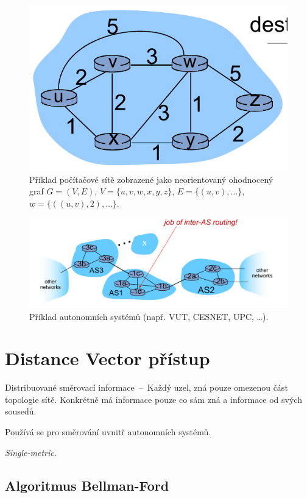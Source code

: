 \begin{figure}[H]
    \centering
    \includegraphics[width=0.5\linewidth]{network_abstraction.pdf}
    \caption{Příklad počítačové sítě zobrazené jako neorientovaný ohodnocený graf $G=(V, E)$, $V=\{u, v, w, x, y, z\}$, $E = \{ (u, v), \dots \}$, $w = \{ ((u, v), 2), \dots \}$.}
\end{figure}

\begin{figure}[H]
    \centering
    \includegraphics[width=1\linewidth]{autonomni_systemy.pdf}
    \caption{Příklad autonomních systémů (např. VUT, CESNET, UPC, \dots).}
\end{figure}


\section{Distance Vector přístup}

\begin{compactitem}
    \item Distribuované směrovací informace~--~Každý uzel, zná pouze omezenou část topologie sítě. Konkrétně má informace pouze co sám zná a informace od svých sousedů.
    \item Používá se pro směrování uvnitř autonomních systémů.
    \item \textit{Single-metric}.
\end{compactitem}

\subsection{Algoritmus Bellman-Ford}

